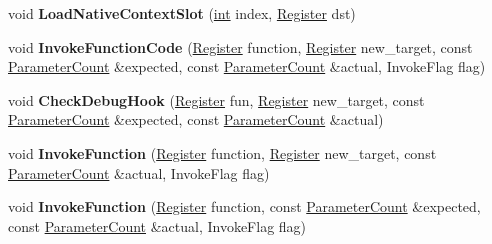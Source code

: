 \begin{DoxyCompactItemize}
void {\bfseries Load\+Native\+Context\+Slot} (\mbox{\hyperlink{classint}{int}} index, \mbox{\hyperlink{classv8_1_1internal_1_1Register}{Register}} dst)
\item 
\mbox{\label{classv8_1_1internal_1_1MacroAssembler_a45a3612fb3be7000eb94309ac385674b}} 
void {\bfseries Invoke\+Function\+Code} (\mbox{\hyperlink{classv8_1_1internal_1_1Register}{Register}} function, \mbox{\hyperlink{classv8_1_1internal_1_1Register}{Register}} new\+\_\+target, const \mbox{\hyperlink{classv8_1_1internal_1_1ParameterCount}{Parameter\+Count}} \&expected, const \mbox{\hyperlink{classv8_1_1internal_1_1ParameterCount}{Parameter\+Count}} \&actual, Invoke\+Flag flag)
\item 
\mbox{\label{classv8_1_1internal_1_1MacroAssembler_a2cf2b9ab50d1b6efcd90587f2502451b}} 
void {\bfseries Check\+Debug\+Hook} (\mbox{\hyperlink{classv8_1_1internal_1_1Register}{Register}} fun, \mbox{\hyperlink{classv8_1_1internal_1_1Register}{Register}} new\+\_\+target, const \mbox{\hyperlink{classv8_1_1internal_1_1ParameterCount}{Parameter\+Count}} \&expected, const \mbox{\hyperlink{classv8_1_1internal_1_1ParameterCount}{Parameter\+Count}} \&actual)
\item 
\mbox{\label{classv8_1_1internal_1_1MacroAssembler_a9a69d864f46bb7b56e46d977b24a9fc4}} 
void {\bfseries Invoke\+Function} (\mbox{\hyperlink{classv8_1_1internal_1_1Register}{Register}} function, \mbox{\hyperlink{classv8_1_1internal_1_1Register}{Register}} new\+\_\+target, const \mbox{\hyperlink{classv8_1_1internal_1_1ParameterCount}{Parameter\+Count}} \&actual, Invoke\+Flag flag)
\item 
\mbox{\label{classv8_1_1internal_1_1MacroAssembler_ab075992a89587b70b074351e93c41bb8}} 
void {\bfseries Invoke\+Function} (\mbox{\hyperlink{classv8_1_1internal_1_1Register}{Register}} function, const \mbox{\hyperlink{classv8_1_1internal_1_1ParameterCount}{Parameter\+Count}} \&expected, const \mbox{\hyperlink{classv8_1_1internal_1_1ParameterCount}{Parameter\+Count}} \&actual, Invoke\+Flag flag)
\item 
\mbox{\label{classv8_1_1internal_1_1MacroAssembler_a24c22317b3c647e2829321dade36cf73}} 

\end{DoxyCompactItemize}
